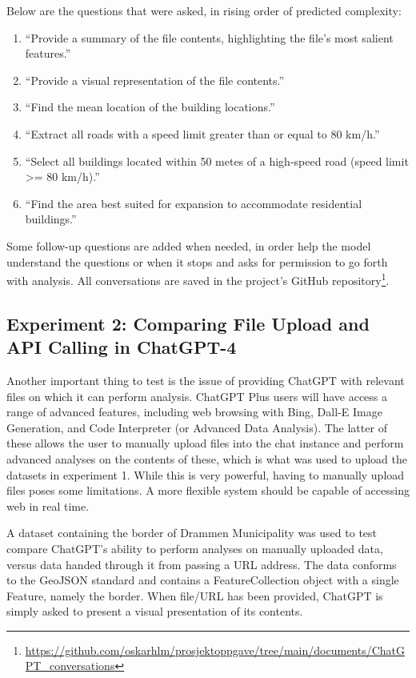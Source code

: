 Below are the questions that were asked, in rising order of predicted complexity:

\begin{enumerate}
    \item \enquote{Provide a summary of the file contents, highlighting the file's most salient features.}
    \item \enquote{Provide a visual representation of the file contents.}
    \item \enquote{Find the mean location of the building locations.}
    \item \enquote{Extract all roads with a speed limit greater than or equal to 80 km/h.}
    \item \enquote{Select all buildings located within 50 metes of a high-speed road (speed limit >= 80 km/h).}
    \item \enquote{Find the area best suited for expansion to accommodate residential buildings.}
\end{enumerate}
\label{enum:gpt-gis-questions}

Some follow-up questions are added when needed, in order help the model understand the questions or when it stops and asks for permission to go forth with analysis. All conversations are saved in the project's GitHub repository\footnote{\url{https://github.com/oskarhlm/prosjektoppgave/tree/main/documents/ChatGPT_conversations}}.

\subsection{Experiment 2: Comparing File Upload and API Calling in ChatGPT-4}

Another important thing to test is the issue of providing ChatGPT with relevant files on which it can perform analysis. ChatGPT Plus users will have access a range of advanced features, including web browsing with Bing, Dall-E Image Generation, and Code Interpreter (or Advanced Data Analysis). The latter of these allows the user to manually upload files into the chat instance and perform advanced analyses on the contents of these, which is what was used to upload the datasets in experiment 1. While this is very powerful, having to manually upload files poses some limitations. A more flexible system should be capable of accessing web  in real time.

A dataset containing the border of Drammen Municipality was used to test compare ChatGPT's ability to perform analyses on manually uploaded data, versus data handed through it from passing a URL address. The data conforms to the GeoJSON standard and contains a FeatureCollection object with a single Feature, namely the border. When file/URL has been provided, ChatGPT is simply asked to present a visual presentation of its contents.

